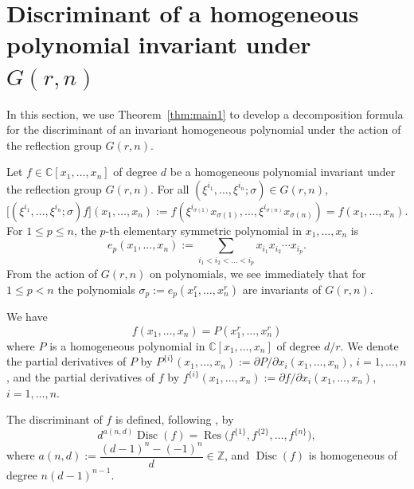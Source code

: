 \documentclass[12pt]{amsart}
\theoremstyle{definition}
\newcommand{\Res}{\operatorname{Res}}
\newcommand{\Disc}{\operatorname{Disc}}
\begin{document}
\section{Discriminant of a homogeneous polynomial invariant under $G(r,n)$}
\label{sec:discriminant}

In this section, we use Theorem~\ref{thm:main1} to develop a decomposition formula for the discriminant of an invariant homogeneous polynomial under the action of the reflection group $G(r,n)$.

Let $f \in \mathbb{C}[x_1,\dots,x_n]$ of degree $d$ be a homogeneous polynomial invariant under the reflection group $G(r,n)$. For all $(\xi^{i_1},\dots,\xi^{i_n};\sigma) \in G(r,n)$,
\begin{equation}
\label{eq:finv}
\big[(\xi^{i_1},\dots,\xi^{i_n};\sigma)f\big](x_1,\dots,x_n) := f(\xi^{i_{\sigma(1)}}x_{\sigma(1)},\dots,\xi^{i_{\sigma(n)}}x_{\sigma(n)}) = f(x_1,\dots,x_n).
\end{equation}
For $1 \leqslant p \leqslant n$, the $p$-th elementary symmetric polynomial in $x_1,\dots,x_n$ is
\[
e_p(x_1,\dots,x_n) := \sum_{i_1<i_2<\dots<i_p} x_{i_1}x_{i_2}\cdots x_{i_p}.
\]
From the action of $G(r,n)$ on polynomials, we see immediately that for $1 \leqslant p < n$ the polynomials $\sigma_p := e_p(x_1^r,\dots,x_n^r)$ are invariants of $G(r,n)$.

We have
\begin{equation}
\label{eq:fPdisc}
f(x_1,\dots,x_n) = P(x_1^r,\dots,x_n^r)
\end{equation}
where $P$ is a homogeneous polynomial in $\mathbb{C}[x_1,\dots,x_n]$ of degree $d/r$. We denote the partial derivatives of $P$ by $P^{\{i\}}(x_1,\dots,x_n) := \partial P/\partial x_i(x_1,\dots,x_n)$, $i=1,\dots,n$, and the partial derivatives of $f$ by $f^{\{i\}}(x_1,\dots,x_n) := \partial f/\partial x_i(x_1,\dots,x_n)$, $i=1,\dots,n$.

The discriminant of $f$ is defined, following \citep{Demazure2012}, by
\begin{equation}
\label{eq:discres}
d^{a(n,d)}\Disc(f) = \Res\big(f^{\{1\}},f^{\{2\}},\dots,f^{\{n\}}\big),
\end{equation}
where $a(n,d) := \dfrac{(d-1)^n-(-1)^n}{d} \in \mathbb{Z}$, and $\Disc(f)$ is homogeneous of degree $n(d-1)^{n-1}$.
\end{document}
